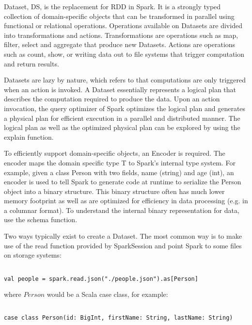 \documentclass[main.tex]{thesis.tex}
\begin{document}
Dataset, DS, is the replacement for RDD in Spark.
It is a strongly typed collection of domain-specific objects that can be transformed in parallel using functional or relational operations.
Operations available on Datasets are divided into transformations and actions.
Transformations are operations such as map, filter, select and aggregate that produce new Datasets.
Actions are operations such as count, show, or writing data out to file systems that trigger computation and return results. \cite{spark-dataset}

Datasets are lazy by nature, which refers to that computations are only triggered when an action is invoked.
A Dataset essentially represents a logical plan that describes the computation required to produce the data.
Upon an action invocation, the query optimizer of Spark optimizes the logical plan and generates a physical plan for efficient execution in a parallel and distributed manner.
The logical plan as well as the optimized physical plan can be explored by using the explain function. \cite{spark-dataset}

To efficiently support domain-specific objects, an Encoder is required.
The encoder maps the domain specific type T to Spark's internal type system.
For example, given a class Person with two fields, name (string) and age (int), an encoder is used to tell Spark to generate code at runtime to serialize the Person object into a binary structure.
This binary structure often has much lower memory footprint as well as are optimized for efficiency in data processing (e.g. in a columnar format).
To understand the internal binary representation for data, use the schema function.

Two ways typically exist to create a Dataset.
The most common way is to make use of the read function provided by SparkSession and point Spark to some files on storage systems:

\lstset{
	frame=0,
	language=Scala
}

\begin{lstlisting}[caption=Creating a new Dataset by using read function]

val people = spark.read.json("./people.json").as[Person]

\end{lstlisting}

where $Person$ would be a Scala case class, for example:

\begin{lstlisting}[caption=Definition of case class Person]

case class Person(id: BigInt, firstName: String, lastName: String)

\end{lstlisting}
\end{document}
